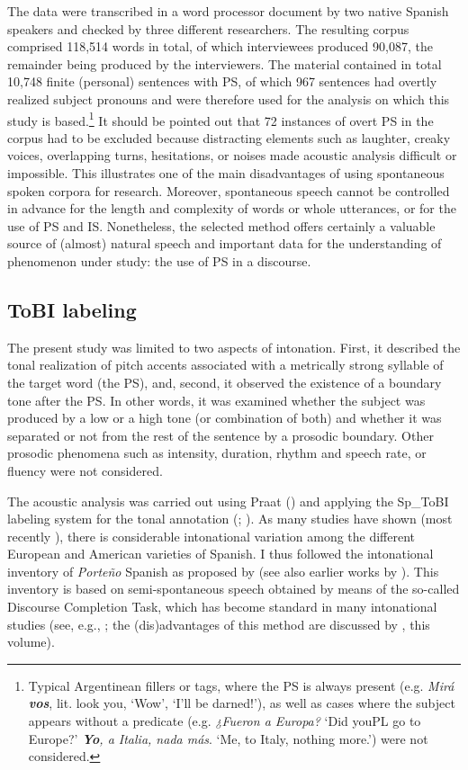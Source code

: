 \documentclass[output=paper]{langsci/langscibook}
\begin{document}
The data were transcribed in a word processor document by two native Spanish speakers and checked by three different researchers. The resulting corpus comprised 118,514 words in total, of which interviewees produced 90,087, the remainder being produced by the interviewers. The material contained in total 10,748 finite (personal) sentences with PS, of which 967 sentences had overtly realized subject pronouns and were therefore used for the analysis on which this study is based.\footnote{Typical Argentinean fillers or tags, where the PS is always present (e.g. \textit{Mirá} \textbf{\textit{vos}}, lit. look you, ‘Wow’, ‘I’ll be darned!’), as well as cases where the subject appears without a predicate (e.g. \textit{¿Fueron a Europa?} ‘Did youPL go to Europe?’ \textbf{\textit{Yo}}\textit{, a Italia, nada más}. ‘Me, to Italy, nothing more.’) were not considered.} It should be pointed out that 72 instances of overt PS in the corpus had to be excluded because distracting elements such as laughter, creaky voices, overlapping turns, hesitations, or noises made acoustic analysis difficult or impossible. This illustrates one of the main disadvantages of using spontaneous spoken corpora for research. Moreover, spontaneous speech cannot be controlled in advance for the length and complexity of words or whole utterances, or for the use of PS and IS. Nonetheless, the selected method offers certainly a valuable source of (almost) natural speech and important data for the understanding of phenomenon under study: the use of PS in a discourse.
 
\subsection{ToBI labeling}
\label{sec:pes:3.2}
The present study was limited to two aspects of intonation. First, it described the tonal realization of pitch accents associated with a metrically strong syllable of the target word (the PS), and, second, it observed the existence of a boundary tone after the PS. In other words, it was examined whether the subject was produced by a low or a high tone (or combination of both) and whether it was separated or not from the rest of the sentence by a prosodic boundary. Other prosodic phenomena such as intensity, duration, rhythm and speech rate, or fluency were not considered.

The acoustic analysis was carried out using Praat (\citealt{Boersma.praat}) and applying the Sp\_ToBI labeling system for the tonal annotation (\citealt{Aguilar.2009}; \citealt{EstebasVilaplanaPrieto.2008,Prieto2010}). As many studies have shown (most recently \citealt{Hualde2015}), there is considerable intonational variation among the different European and American varieties of Spanish. I thus followed the intonational inventory of \textit{Porte{\~n}o} Spanish as proposed by \citet{Gabriel2010incollection,Gabriel2013} (see also earlier works by \citealt{Toledo2000,Kaisse2001,Colantoni2004}). This inventory is based on semi-spontaneous speech obtained by means of the so-called Discourse Completion Task, which has become standard in many intonational studies (see, e.g., \citealt{Prieto2010,frotaPrieto2015}; the (dis)advantages of this method are discussed by \citealt{Vanrell.2018}, this volume).
\end{document}
